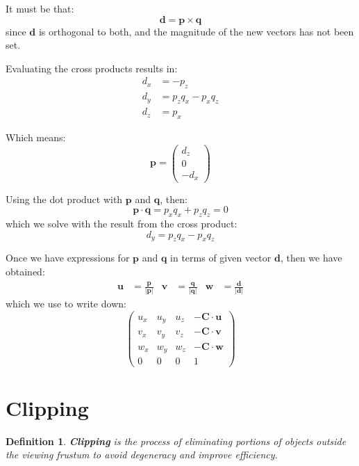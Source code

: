 \documentclass[11pt]{article}
\newtheorem{defn}{Definition}
\begin{document}
It must be that:
\[
  \textbf{d} = \textbf{p} \times \textbf{q} 
\]
since $\textbf{d}$ is orthogonal to both, and the magnitude of the new vectors has not been set.

Evaluating the cross products results in:
\begin{align*}
  d_x &= -p_z \\
  d_y &= p_zq_x - p_xq_z \\
  d_z &= p_x
\end{align*}

Which means:
\[
  \textbf{p} = \begin{pmatrix} d_z \\ 0 \\ -d_x \end{pmatrix} 
\]

Using the dot product with $\textbf{p}$ and $\textbf{q}$, then:
\[
  \textbf{p} \cdot \textbf{q} = p_xq_x + p_zq_z = 0
\]
which we solve with the result from the cross product:
\[
  d_y = p_zq_x - p_xq_z
\]

Once we have expressions for $\textbf{p}$ and $\textbf{q}$ in terms of given vector $\textbf{d}$, then we have obtained:
\begin{align*}
  \textbf{u} &= \frac{\textbf{p}}{\lvert \textbf{p} \rvert} &
  \textbf{v} &= \frac{\textbf{q}}{\lvert \textbf{q} \rvert} &
  \textbf{w} &= \frac{\textbf{d}}{\lvert \textbf{d} \rvert}
\end{align*}
which we use to write down:
\[
  \begin{pmatrix}
    u_x & u_y & u_z & -\textbf{C} \cdot \textbf{u} \\ 
    v_x & v_y & v_z & -\textbf{C} \cdot \textbf{v} \\ 
    w_x & w_y & w_z & -\textbf{C} \cdot \textbf{w} \\ 
    0 & 0 & 0 & 1
  \end{pmatrix}
\]

\section{Clipping}
\begin{defn}
  \textbf{Clipping} is the process of eliminating portions of objects outside the viewing frustum to avoid degeneracy and improve efficiency.
\end{defn}
\end{document}
